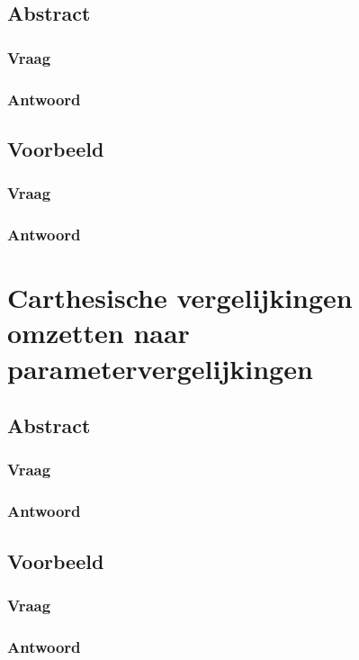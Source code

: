 \documentclass[main.tex]{subfiles}
\begin{document}
\subsection{Abstract}
\subsubsection{Vraag}
\subsubsection{Antwoord}

\subsection{Voorbeeld}
\subsubsection{Vraag}
\subsubsection{Antwoord}

\section{Carthesische vergelijkingen omzetten naar parametervergelijkingen}
\subsection{Abstract}
\subsubsection{Vraag}
\subsubsection{Antwoord}

\subsection{Voorbeeld}
\subsubsection{Vraag}
\subsubsection{Antwoord}

\newpage
\end{document}
